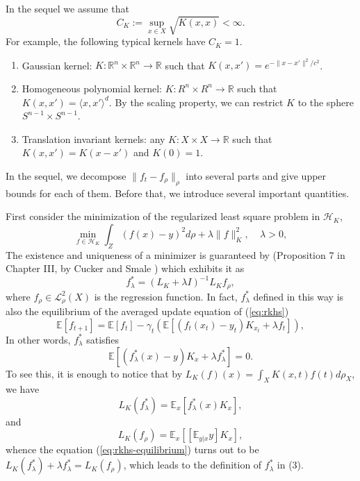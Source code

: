 \documentclass[twoside]{amsart}
\theoremstyle{theorem}
\theoremstyle{definition}
\theoremstyle{remark}
\def\L{{\mathscr L}}
\def\H{{\mathscr H}}
\def\R{{\mathbb R}}        %
\def\E{{\mathbb E}}        %
\def\L{{\mathscr L}}     %
\def\<{{\langle}}
\def\>{{\rangle}}
\begin{document}
\bigskip

In the sequel we assume that
\begin{equation} \label{eq:ck}
C_K:=\sup_{x\in X} \sqrt{K(x,x)} < \infty.
\end{equation}
For example, the following typical kernels have $C_K=1$.

\begin{enumerate}
\item Gaussian kernel: $K:\R^n\times \R^n \to \R$ such that $K(x,x')=e^{-\|x-x'\|^2/c^2}$.
\item Homogeneous polynomial kernel: $K:R^n \times R^n \to \R$ such that $K(x,x')=\<x,x'\>^d$. By the scaling property, we can restrict $K$ to
the sphere $S^{n-1}\times S^{n-1}$.
\item Translation invariant kernels: any $K:X\times X \to \R$ such that $K(x,x')=K(x-x')$ and $K(0)=1$.
\end{enumerate}

\bigskip

In the sequel, we decompose $\|f_t - f_\rho \|_\rho$ into several
parts and give upper bounds for each of them.
Before that, we
introduce several important quantities.

First consider the minimization of the regularized least square
problem in $\H_K$,
\[ \min_{f\in \H_K} \int_Z (f(x)-y)^2 d \rho + \lambda \|f\|^2_K,  \ \ \ \ \ \lambda>0, \]
The existence and uniqueness of a minimizer is guaranteed by
(Proposition 7 in Chapter III, by Cucker and Smale
\cite{CucSma02}) which exhibits it as
\begin{equation}
f^\ast_\lambda = (L_K + \lambda I )^{-1} L_K f_\rho,
\end{equation}
where $f_\rho\in \L^2_\rho(X)$ is the regression function.
In fact, $f^\ast_\lambda$ defined in this way is also the equilibrium of the averaged
update equation of (\ref{eq:rkhs})
\begin{equation} \label{eq:avgrkhs}
\E [f_{t+1}] = \E[f_t] - \gamma_t(\E[( f_t(x_t)-y_t) K_{x_t}+\lambda f_t ]),
\end{equation}
In other words, $f^\ast_\lambda$ satisfies
\begin{equation} \label{eq:rkhs-equilibrium}
\E[( f^\ast_\lambda(x)-y) K_{x}+ \lambda f^\ast_\lambda]=0.
\end{equation}
To see this, it is enough to notice that by $L_K(f)(x)=\int_X K(x,t)f(t)d \rho_X$, we have
\[ L_K(f^\ast_\lambda)=\E_x[f^\ast_\lambda(x)K_x], \]
and
\[ L_K(f_\rho)=\E_x [[\E_{y|x}y] K_x], \]
whence the equation (\ref{eq:rkhs-equilibrium}) turns out to be $
L_K(f^\ast_\lambda) + \lambda f^\ast_\lambda = L_K( f_\rho)$,
which leads to the definition of $f^\ast_\lambda$ in (3).
\end{document}
